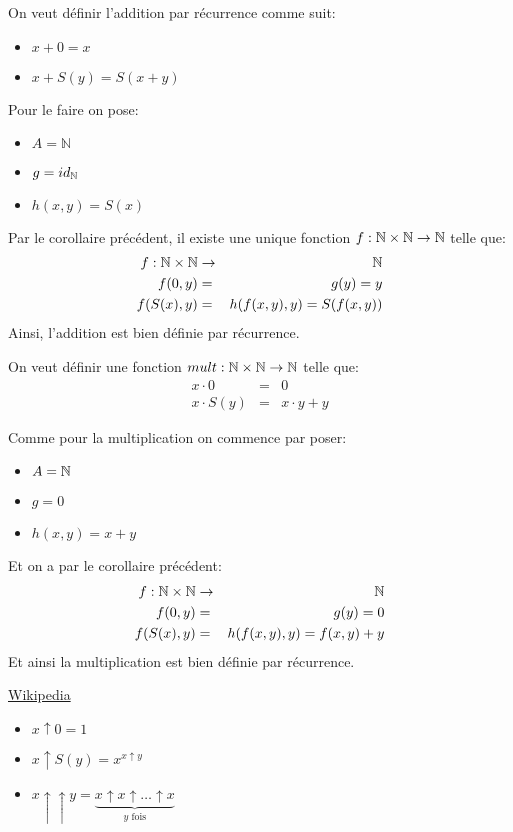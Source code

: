 \begin{example}
	On veut définir l'addition par récurrence comme suit:
	\begin{itemize}
		\item $x + 0 = x$
		\item $x + S(y) = S(x + y)$
	\end{itemize}
	Pour le faire on pose:
	\begin{itemize}
		\item $A = \mathbb{N}$
		\item $g = id_{\mathbb{N}}$
		\item $h(x,y) = S(x)$
	\end{itemize}
	Par le corollaire précédent, il existe une unique fonction $f: \mathbb{N} \times \mathbb{N} \to \mathbb{N}$ telle que:
	\begin{eqnarray*}
		f : \mathbb{N} \times \mathbb{N} & \to & \mathbb{N} \\
		f(0,y) & = & g(y) = y \\
		f(S(x),y) & = & h(f(x,y),y) = S(f(x,y))
	\end{eqnarray*}
	Ainsi, l'addition est bien définie par récurrence.
\end{example}

\begin{example}
	On veut définir une fonction $mult: \mathbb{N} \times \mathbb{N} \to \mathbb{N}$ telle que:
	\begin{eqnarray*}
		x \cdot 0 & = & 0 \\
		x \cdot S(y) & = & x \cdot y + y
	\end{eqnarray*}

	Comme pour la multiplication on commence par poser:
	\begin{itemize}
		\item $A = \mathbb{N}$
		\item $g = 0$
		\item $h(x,y) = x + y$
	\end{itemize}

	Et on a par le corollaire précédent:
	\begin{eqnarray*}
		f : \mathbb{N} \times \mathbb{N} & \to & \mathbb{N} \\
		f(0,y) & = & g(y) = 0 \\
		f(S(x),y) & = & h(f(x,y),y) = f(x,y) + y
	\end{eqnarray*}
	Et ainsi la multiplication est bien définie par récurrence.
\end{example}


\begin{example} \href{https://en.wikipedia.org/wiki/Knuth\%27s_up-arrow_notation}{Wikipedia}
	\begin{itemize}
		\item $x \uparrow 0 = 1$
		\item $x \uparrow S(y) = x^{x \uparrow y}$
		\item $x \uparrow \uparrow y = \underbrace{x \uparrow x \uparrow \ldots \uparrow x}_{y \text{ fois}}$
	\end{itemize}
\end{example}
